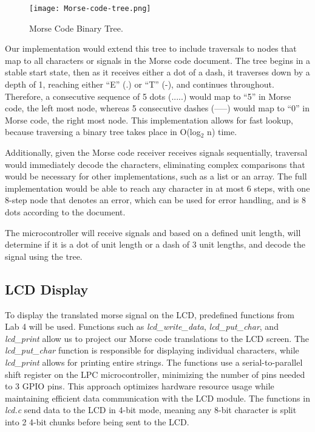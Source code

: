 \documentclass{cce2014-design}
\begin{document}
\begin{figure}[h]
    \centering
    \texttt{[image: Morse-code-tree.png]}
    \caption{Morse Code Binary Tree.}
    \label{fig:morse_tree}
\end{figure}

Our implementation would extend this tree to include traversals to nodes that map to all characters or signals in the Morse code document. The tree begins in a stable start state, then as it receives either a dot of a dash, it traverses down by a depth of 1, reaching either “E” (.) or “T” (-), and continues throughout. Therefore, a consecutive sequence of 5 dots (.....) would map to “5” in Morse code, the left most node, whereas 5 consecutive dashes (-----) would map to “0” in Morse code, the right most node. This implementation allows for fast lookup, because traversing a binary tree takes place in O(log$_2$ n) time. 

Additionally, given the Morse code receiver receives signals sequentially, traversal would immediately decode the characters, eliminating complex comparisons that would be necessary for other implementations, such as a list or an array. The full implementation would be able to reach any character in at most 6 steps, with one 8-step node that denotes an error, which can be used for error handling, and is 8 dots according to the document.

The microcontroller will receive signals and based on a defined unit length, will determine if it is a dot of unit length or a dash of 3 unit lengths, and decode the signal using the tree.
\subsection{LCD Display}
To display the translated morse signal on the LCD, predefined functions from Lab 4 will be used. Functions such as \textit{lcd\_write\_data}, \textit{lcd\_put\_char}, and \textit{lcd\_print} allow us to project our Morse code translations to the LCD screen. The \textit{lcd\_put\_char} function is responsible for displaying individual characters, while \textit{lcd\_print} allows for printing entire strings. The functions use a serial-to-parallel shift register on the LPC microcontroller, minimizing the number of pins needed to 3 GPIO pins. This approach optimizes hardware resource usage while maintaining efficient data communication with the LCD module. The functions in \textit{lcd.c} send data to the LCD in 4-bit mode, meaning any 8-bit character is split into 2 4-bit chunks before being sent to the LCD. 
\end{document}
